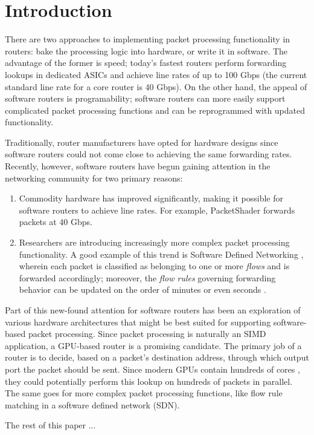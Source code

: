 \section{Introduction}

There are two approaches to implementing packet processing functionality in
routers: bake the processing logic into hardware, or write it in software. The
advantage of the former is speed; today's fastest routers perform forwarding
lookups in dedicated ASICs and achieve line rates of up to 100 Gbps (the
current standard line rate for a core router is 40 Gbps).  On the other hand,
the appeal of software routers is programability; software routers can more
easily support complicated packet processing functions and can be reprogrammed
with updated functionality.

Traditionally, router manufacturers have opted for hardware designs since
software routers could not come close to achieving the same forwarding rates.
Recently, however, software routers have begun gaining attention in the
networking community for two primary reasons:
\begin{enumerate}
	\item Commodity hardware has improved significantly, making it possible for
	software routers to achieve line rates. For example, PacketShader forwards
	packets at 40 Gbps. 

	\item Researchers are introducing increasingly more complex packet
	processing functionality. A good example of this trend is Software Defined
	Networking , wherein each packet is classified as belonging to
	one or more \emph{flows} and is forwarded accordingly; moreover, the
	\emph{flow rules} governing forwarding behavior can be updated on the order
	of minutes or even seconds .
\end{enumerate}

Part of this new-found attention for software routers has been an exploration
of various hardware architectures that might be best suited for supporting
software-based packet processing. Since packet processing is naturally an SIMD
application, a GPU-based router is a promising candidate. The primary job of a
router is to decide, based on a packet's destination address, through which
output port the packet should be sent. Since modern GPUs contain hundreds of
cores , they could potentially perform this lookup on hundreds of
packets in parallel. The same goes for more complex packet processing
functions, like flow rule matching in a software defined network (SDN).

The rest of this paper ... 
